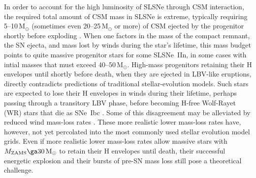 \documentclass[fleqn,usenatbib,useAMS]{mnras}
\begin{document}
In order to account for the high
luminosity of SLSNe through CSM interaction, the required total amount
of CSM mass in SLSNe is extreme, typically requiring 5--10\,M$_{\odot}$
(sometimes even 20--25\,M$_{\odot}$ or more) of CSM ejected by the progenitor
shortly before exploding
\citep{dickinson23,nicholl20,rest11,sm07,smith08tf,smith10,woosley07}.
When one factors in the mass of the compact remnant, the SN ejecta,
and mass lost by winds during the star's lifetime, this mass budget
points to quite massive progenitor stars for some SLSNe~IIn, in some
cases with intial masses that must exceed 40--50\,M$_{\odot}$.
High-mass progenitors retaining their H envelopes until shortly before
death, when they are ejected in LBV-like eruptions, directly
contradicts predictions of traditional stellar-evolution models.  Such
stars are expected to lose their H envelopes in winds during their
lifetime, perhaps passing through a transitory LBV phase, before
becoming H-free Wolf-Rayet (WR) stars that die as SNe~Ibc
\citep{cm86,woosley93,mm00,heger03}.  Some of this disagreement may be
alleviated by reduced  wind mass-loss
rates \citep[see the review by][for an extended
  discussion]{smith14}.  These more realistic lower mass-loss rates
have, however, not yet percolated into the most commonly used stellar
evolution model grids.  Even if more realistic lower mass-loss rates
allow massive stars with $M_{\rm ZAMS} \ga 30\,{\rm M}_{\odot}$ to retain
their H envelopes until death, their successful energetic explosion
and their bursts of pre-SN mass loss still pose a theoretical challenge.
\end{document}
